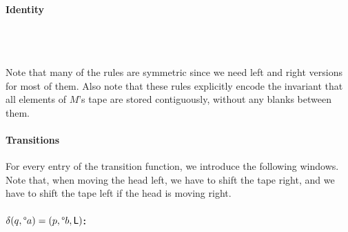\documentclass[a4paper,UKenglish,cleveref, autoref]{lipics-v2019}
\begin{document}
\paragraph*{Identity}
\begin{center}
  \rewwin{\blank & \blank & \blank}{\blank & \blank & \blank} 
  \\[3ex]
   \\[3ex]
\end{center}

Note that many of the rules are symmetric since we need left and right versions for most of them. 
Also note that these rules explicitly encode the invariant that all elements of $M$'s tape are stored contiguously, without any blanks \blank{} between them.

\paragraph*{Transitions}

For every entry of the transition function, we introduce the following windows. Note that, when moving the head left, we have to shift the tape right, and we have to shift the tape left if the head is moving right.

\paragraph*{$\delta(q, \degree a) = (p, \degree b, \textsf{L})$:}
\begin{center}
   \\[3ex]
   \\[3ex]
\end{center}
\end{document}
